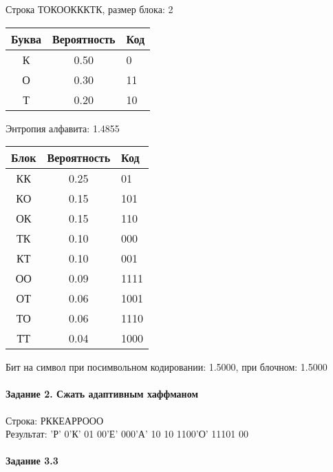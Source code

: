 \documentclass[a4paper, 12pt]{article}
\begin{document}
Строка ТОКООКККТК, размер блока: 2
\begin{center}
 \begin{tabular}{ |c|c|l| } 
  \hline
     Буква & Вероятность & Код\\ \hline
К & 0.50 & 0\\\hline
О & 0.30 & 11\\\hline
Т & 0.20 & 10
\\ \hline \end{tabular}
\end{center}
Энтропия алфавита: 1.4855
\begin{center}
 \begin{tabular}{ |c|c|l| } 
  \hline
     Блок & Вероятность & Код\\ \hline
КК & 0.25 & 01\\\hline
КО & 0.15 & 101\\\hline
ОК & 0.15 & 110\\\hline
ТК & 0.10 & 000\\\hline
КТ & 0.10 & 001\\\hline
ОО & 0.09 & 1111\\\hline
ОТ & 0.06 & 1001\\\hline
ТО & 0.06 & 1110\\\hline
ТТ & 0.04 & 1000
\\ \hline \end{tabular}
\end{center}
Бит на символ при посимвольном кодировании: 1.5000, при блочном: 1.5000


\pagebreak
\paragraph{Задание 2. Сжать адаптивным хаффманом\\}

Строка: 
РККЕАРРООО\\
Результат: 'Р' 0'К' 01 00'Е' 000'А' 10 10 1100'О' 11101 00










\pagebreak

\paragraph{Задание 3.3}
\end{document}

